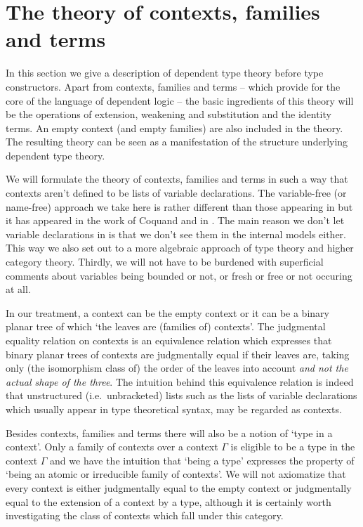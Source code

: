 \section{The theory of contexts, families and terms}\label{tt}
In this section we give a description of dependent type theory before type
constructors. Apart from contexts, families and terms -- which provide for the
core of the language of dependent logic -- the basic ingredients
of this theory will be the operations of extension, weakening and substitution
and the identity terms. An empty context (and empty families) are also included
in the theory. The resulting theory can be seen as a manifestation of the 
structure underlying dependent type theory.

We will
formulate the theory of contexts, families and terms in such a way that contexts aren't defined
to be lists of variable declarations. The variable-free (or name-free) approach 
we take here is rather different than those appearing in 
\cite{hofmann1995extensional,TheBook} but it has appeared in the work of Coquand
and in \cite{Dybjer1996}.
The main reason we don't let variable declarations in is that we don't see them 
in the internal models either. This way we also set out to a more algebraic 
approach of type theory and higher category theory. Thirdly, we will not have to
be burdened with superficial comments about variables being bounded or not, or 
fresh or free or not occuring at all.

In our treatment, a context can be the empty context or it can be a binary
planar tree of which `the leaves are (families of) contexts'. 
The judgmental equality relation on contexts is an equivalence relation which 
expresses that binary planar
trees of contexts are judgmentally equal if their leaves are, taking only
(the isomorphism class of) 
the order of the leaves into account \emph{and not the actual shape of the three}.
The intuition behind this equivalence relation is indeed that unstructured
(i.e.~unbracketed) lists such as the lists of variable declarations which
usually appear in type theoretical syntax, may be regarded as contexts.

Besides contexts, families and terms there will also be a notion of `type in
a context'. Only a family of contexts over a context $\Gamma$ is eligible to
be a type in the context $\Gamma$ and we have the intuition that `being a type'
expresses the property of `being an atomic or irreducible family of contexts'.
We will not axiomatize that every context is either judgmentally equal to the
empty context or judgmentally equal to the extension of a context by a type,
although it is certainly worth investigating the class of contexts which fall
under this category.

